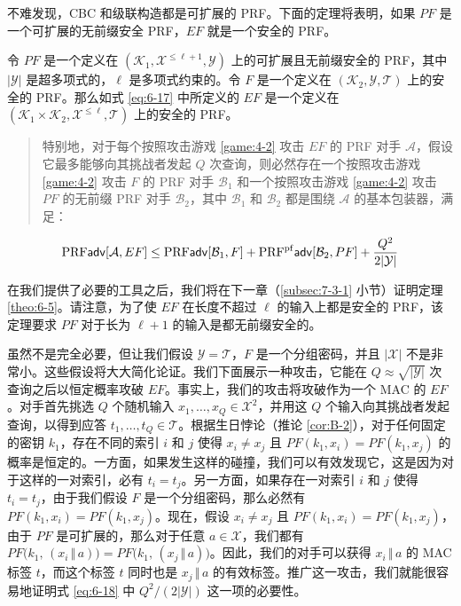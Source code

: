 不难发现，CBC 和级联构造都是可扩展的 PRF。下面的定理将表明，如果 $PF$ 是一个可扩展的无前缀安全 PRF，$EF$ 就是一个安全的 PRF。

\begin{theorem}\label{theo:6-5}
令 $PF$ 是一个定义在 $(\mathcal{K}_1,\mathcal{X}^{\leq\ell+1},\mathcal{Y})$ 上的可扩展且无前缀安全的 PRF，其中 $|\mathcal{Y}|$ 是超多项式的，$\ell$ 是多项式约束的。令 $F$ 是一个定义在 $(\mathcal{K}_2,\mathcal{Y},\mathcal{T})$ 上的安全的 PRF。那么如式 \ref{eq:6-17} 中所定义的 $EF$ 是一个定义在 $(\mathcal{K}_1\times\mathcal{K}_2,\mathcal{X}^{\leq\ell},\mathcal{T})$ 上的安全的 PRF。
\begin{quote}
特别地，对于每个按照攻击游戏 \ref{game:4-2} 攻击 $EF$ 的 PRF 对手 $\mathcal{A}$，假设它最多能够向其挑战者发起 $Q$ 次查询，则必然存在一个按照攻击游戏 \ref{game:4-2} 攻击 $F$ 的 PRF 对手 $\mathcal{B}_1$ 和一个按照攻击游戏 \ref{game:4-2} 攻击 $PF$ 的无前缀 PRF 对手 $\mathcal{B}_2$，其中 $\mathcal{B}_1$ 和 $\mathcal{B}_2$ 都是围绕 $\mathcal{A}$ 的基本包装器，满足：
\end{quote}
\begin{equation}\label{eq:6-18}
{\rm PRF\mathsf{adv}}[\mathcal{A},EF]\leq {\rm PRF\mathsf{adv}}[\mathcal{B}_1,F]+{\rm PRF^{pf}\mathsf{adv}}[\mathcal{B}_2,PF]+\frac{Q^2}{2|\mathcal{Y}|}
\end{equation}
\end{theorem}

\noindent
在我们提供了必要的工具之后，我们将在下一章（\ref{subsec:7-3-1} 小节）证明定理 \ref{theo:6-5}。请注意，为了使 $EF$ 在长度不超过 $\ell$ 的输入上都是安全的 PRF，该定理要求 $PF$ 对于长为 $\ell+1$ 的输入是都无前缀安全的。

\begin{snote}
虽然不是完全必要，但让我们假设 $\mathcal{Y}=\mathcal{T}$，$F$ 是一个分组密码，并且 $|\mathcal{X}|$ 不是非常小。这些假设将大大简化论证。我们下面展示一种攻击，它能在 $Q\approx\sqrt{|\mathcal{Y}|}$ 次查询之后以恒定概率攻破 $EF$。事实上，我们的攻击将攻破作为一个 MAC 的 $EF$。对手首先挑选 $Q$ 个随机输入 $x_1,\dots,x_Q\in\mathcal{X}^2$，并用这 $Q$ 个输入向其挑战者发起查询，以得到应答 $t_1,\dots,t_Q\in\mathcal{T}$。根据生日悖论（推论 \ref{cor:B-2}），对于任何固定的密钥 $k_1$，存在不同的索引 $i$ 和 $j$ 使得 $x_i\neq x_j$ 且 $PF(k_1,x_i)=PF(k_1,x_j)$ 的概率是恒定的。一方面，如果发生这样的碰撞，我们可以有效发现它，这是因为对于这样的一对索引，必有 $t_i=t_j$。另一方面，如果存在一对索引 $i$ 和 $j$ 使得 $t_i=t_j$，由于我们假设 $F$ 是一个分组密码，那么必然有 $PF(k_1,x_i)=PF(k_1,x_j)$。现在，假设 $x_i\neq x_j$ 且 $PF(k_1,x_i)=PF(k_1,x_j)$，由于 $PF$ 是可扩展的，那么对于任意 $a\in\mathcal{X}$，我们都有 $PF\big(k_1,\,(x_i\,\Vert\,a)\big)=PF\big(k_1,\,(x_j\,\Vert\,a)\big)$。因此，我们的对手可以获得 $x_i\,\Vert\,a$ 的 MAC 标签 $t$，而这个标签 $t$ 同时也是 $x_j\,\Vert\,a$ 的有效标签。推广这一攻击，我们就能很容易地证明式 \ref{eq:6-18} 中 ${Q^2}/{(2|\mathcal{Y}|)}$ 这一项的必要性。
\end{snote}


